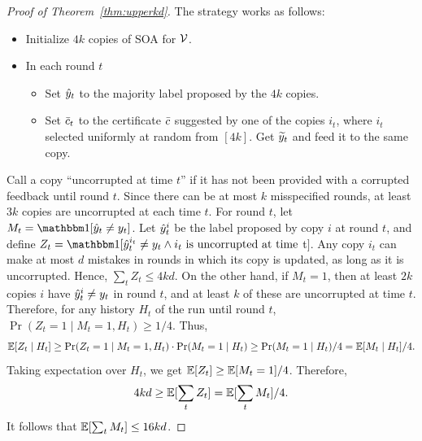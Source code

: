 \documentclass[11pt,letterpaper]{article}
\theoremstyle{definition}
\theoremstyle{plain}
\begin{document}
\begin{proof}[Proof of Theorem~\ref{thm:upperkd}]
The strategy works as follows: 
\begin{itemize}
    \item Initialize $4k$ copies of SOA for $\V$.
    \item In each round $t$
    \begin{itemize}
        \item Set $\hy_t$ to the majority label proposed by the $4k$ copies.
        \item Set $\sc_t$ to the certificate $\sc$ suggested by one of the copies $i_t$, where $i_t$ selected uniformly at random from $[4k]$. Get $\vy_t$ and feed it to the same copy.
    \end{itemize}
\end{itemize}
Call a copy ``uncorrupted at time $t$'' if it has not been provided with a corrupted feedback until round $t$. Since there can be at most $k$ misspecified rounds, at least $3k$ copies are uncorrupted at each time $t$. For round $t$, let $M_t = \indct[\hy_t \neq y_t]$. Let $\hy_t^i$ be the label proposed by copy $i$ at round $t$, and define $Z_t = \indct[\hy_t^{i_t} \neq y_t \wedge i_t \text{ is uncorrupted at time }$t$]$. Any copy $i_t$ can make at most $d$ mistakes in rounds in which its copy is updated, as long as it is uncorrupted. Hence, $\sum_t Z_t \leq 4kd$. On the other hand, if $M_t = 1$, then at least $2k$ copies $i$ have $\hy_t^{i} \neq y_t$ in round $t$, and at least $k$ of these are uncorrupted at time $t$. 
Therefore, for any history $H_t$ of the run until round $t$, $\Pr(Z_t = 1 \mid M_t = 1, H_t) \geq 1/4$. 
Thus,
\[
\ex[Z_t \mid H_t] \geq \Pr(Z_t = 1 \mid M_t = 1, H_t)\cdot \Pr(M_t = 1 \mid H_t) \geq \Pr(M_t = 1 \mid H_t)/4 = \ex[M_t \mid H_t]/4.
\]
Taking expectation over $H_t$, we get $\ex[Z_t] \geq \ex[M_t = 1]/4$.
Therefore,
\[
4kd \geq \ex[\sum_t Z_t] = \ex[\sum_t M_t]/4.
\]
It follows that $\ex[\sum_t M_t] \leq 16kd$.
\end{proof}
\end{document}
